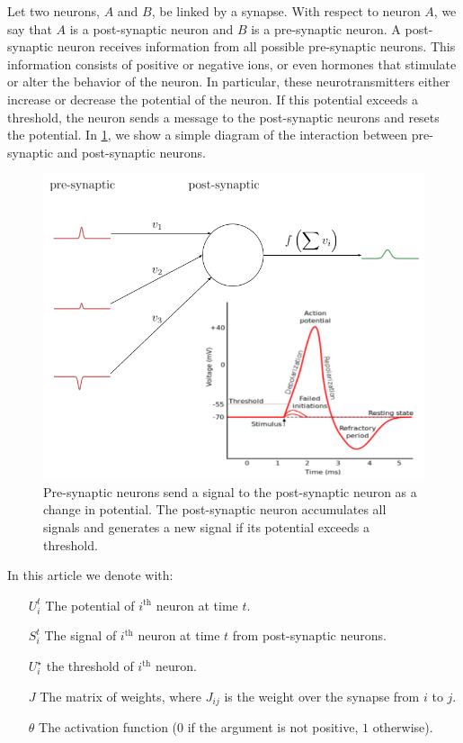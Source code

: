 \noindent Let two neurons, $A$ and $B$, be linked by a synapse. With respect to neuron $A$, we say that $A$ is a post-synaptic neuron and $B$ is a pre-synaptic neuron. A post-synaptic neuron receives information from all possible pre-synaptic neurons. This information consists of positive or negative ions, or even hormones that stimulate or alter the behavior of the neuron. In particular, these neurotransmitters either increase or decrease the potential of the neuron. If this potential exceeds a threshold, the neuron sends a message to the post-synaptic neurons and resets the potential. In \cref{fig:simple_diagram}, we show a simple diagram of the interaction between pre-synaptic and post-synaptic neurons.
\begin{figure}[htbp]
    \centering
    \includegraphics[width=0.8\linewidth]{Figures/simple_diagram.png}
    \caption{Pre-synaptic neurons send a signal to the post-synaptic neuron as a change in potential. The post-synaptic neuron accumulates all signals and generates a new signal if its potential exceeds a threshold.}
    \label{fig:simple_diagram}
\end{figure}
\begin{notation} In this article we denote with:
    \begin{itemize}
        \item[$U_i^t$] The potential of ${i}^\mathrm{th}$ neuron at time $t$.
        \item[$S_i^t$] The signal of ${i}^\mathrm{th}$ neuron at time $t$ from post-synaptic neurons.
        \item[$U_i^\star$] the threshold of ${i}^\mathrm{th}$ neuron.
        \item[$J$] The matrix of weights, where $J_{ij}$ is the weight over the synapse from $i$ to $j$.
        \item[$\theta$] The activation function ($0$ if the argument is not positive, $1$ otherwise).
    \end{itemize}
\end{notation}
